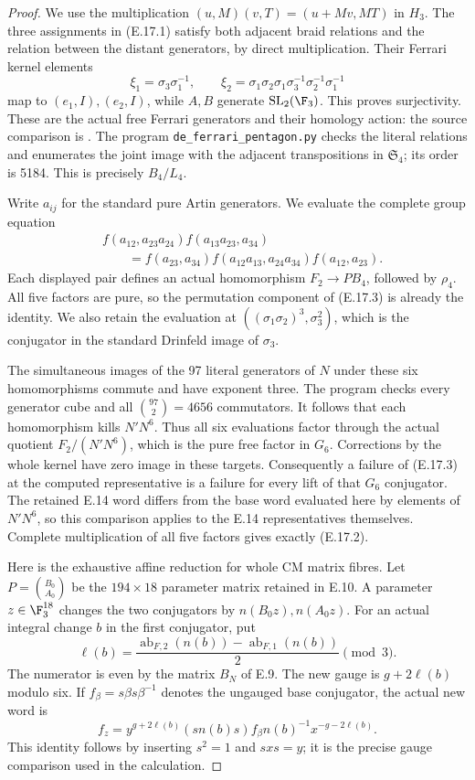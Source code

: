 \begin{proof}
We use the multiplication
$(u,M)(v,T)=(u+Mv,MT)$ in $H_3$.
The three assignments in (E.17.1) satisfy both adjacent
braid relations and the relation between the distant
generators, by direct multiplication. Their Ferrari
kernel elements
\[
 \xi_1=\sigma_3\sigma_1^{-1},\qquad
 \xi_2=\sigma_1\sigma_2\sigma_1
                  \sigma_3^{-1}\sigma_2^{-1}\sigma_1^{-1}
\]
map to $(e_1,I),(e_2,I)$, while $A,B$ generate
$\mathrm{SL}_2(\F_3)$. This proves surjectivity.
These are the actual free Ferrari generators and their
homology action: the source comparison is
\cite[(2.9) and (4.15)]{DE_NakamuraTsunogaiYasuda2010}.
The program \texttt{de\_ferrari\_pentagon.py} checks the
literal relations and enumerates the joint image with
the adjacent transpositions in $\mathfrak S_4$;
its order is 5184. This is precisely $B_4/L_4$.

Write $a_{ij}$ for the standard pure Artin generators.
We evaluate the complete group equation
\[
 \begin{aligned}
 &f(a_{12},a_{23}a_{24})f(a_{13}a_{23},a_{34})\\
 &\qquad=f(a_{23},a_{34})
       f(a_{12}a_{13},a_{24}a_{34})f(a_{12},a_{23}).
 \end{aligned}
 \tag{E.17.3}
\]
Each displayed pair defines an actual homomorphism
$F_2\to PB_4$, followed by $\rho_4$.
All five factors are pure, so the permutation component
of (E.17.3) is already the identity. We also retain
the evaluation at
$((\sigma_1\sigma_2)^3,\sigma_3^2)$, which is the
conjugator in the standard Drinfeld image of
$\sigma_3$.

The simultaneous images of the 97 literal generators
of $N$ under these six homomorphisms commute and have
exponent three. The program checks every generator
cube and all $\binom{97}{2}=4656$ commutators.
It follows that each homomorphism kills $N'N^6$.
Thus all six evaluations factor through the actual
quotient $F_2/(N'N^6)$, which is the pure free factor
in $G_6$. Corrections by the whole kernel have zero
image in these targets. Consequently a failure of
(E.17.3) at the computed representative is a failure
for every lift of that $G_6$ conjugator.
The retained E.14 word differs from the base word
evaluated here by elements of $N'N^6$, so this
comparison applies to the E.14 representatives
themselves. Complete multiplication of all five
factors gives exactly (E.17.2).

Here is the exhaustive affine reduction for whole
CM matrix fibres. Let $P=\binom{B_0}{A_0}$ be the
$194\times18$ parameter matrix retained in E.10.
A parameter $z\in\F_3^{18}$ changes the two
conjugators by $n(B_0z),n(A_0z)$. For an actual
integral change $b$ in the first conjugator, put
\[
 \ell(b)=\frac{
       \operatorname{ab}_{F,2}(n(b))-
       \operatorname{ab}_{F,1}(n(b))}{2}\pmod3.
\]
The numerator is even by the matrix $B_N$ of E.9.
The new gauge is $g+2\ell(b)$ modulo six.
If $f_\beta=s\beta s\beta^{-1}$ denotes the
ungauged base conjugator, the actual new word is
\[
 f_z=y^{g+2\ell(b)}
       (s n(b)s) f_\beta n(b)^{-1}
                  x^{-g-2\ell(b)}.
 \tag{E.17.4}
\]
This identity follows by inserting $s^2=1$ and
$sxs=y$; it is the precise gauge comparison used
in the calculation.


\end{proof}
